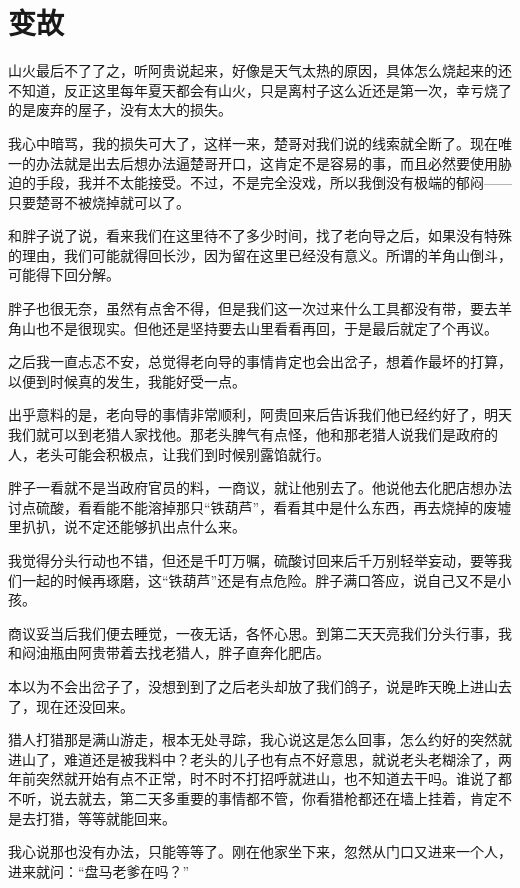 \chapter{变故}

山火最后不了了之，听阿贵说起来，好像是天气太热的原因，具体怎么烧起来的还不知道，反正这里每年夏天都会有山火，只是离村子这么近还是第一次，幸亏烧了的是废弃的屋子，没有太大的损失。

我心中暗骂，我的损失可大了，这样一来，楚哥对我们说的线索就全断了。现在唯一的办法就是出去后想办法逼楚哥开口，这肯定不是容易的事，而且必然要使用胁迫的手段，我并不太能接受。不过，不是完全没戏，所以我倒没有极端的郁闷——只要楚哥不被烧掉就可以了。

和胖子说了说，看来我们在这里待不了多少时间，找了老向导之后，如果没有特殊的理由，我们可能就得回长沙，因为留在这里已经没有意义。所谓的羊角山倒斗，可能得下回分解。

胖子也很无奈，虽然有点舍不得，但是我们这一次过来什么工具都没有带，要去羊角山也不是很现实。但他还是坚持要去山里看看再回，于是最后就定了个再议。

之后我一直忐忑不安，总觉得老向导的事情肯定也会出岔子，想着作最坏的打算，以便到时候真的发生，我能好受一点。

出乎意料的是，老向导的事情非常顺利，阿贵回来后告诉我们他已经约好了，明天我们就可以到老猎人家找他。那老头脾气有点怪，他和那老猎人说我们是政府的人，老头可能会积极点，让我们到时候别露馅就行。

胖子一看就不是当政府官员的料，一商议，就让他别去了。他说他去化肥店想办法讨点硫酸，看看能不能溶掉那只“铁葫芦”，看看其中是什么东西，再去烧掉的废墟里扒扒，说不定还能够扒出点什么来。

我觉得分头行动也不错，但还是千叮万嘱，硫酸讨回来后千万别轻举妄动，要等我们一起的时候再琢磨，这“铁葫芦”还是有点危险。胖子满口答应，说自己又不是小孩。

商议妥当后我们便去睡觉，一夜无话，各怀心思。到第二天天亮我们分头行事，我和闷油瓶由阿贵带着去找老猎人，胖子直奔化肥店。

本以为不会出岔子了，没想到到了之后老头却放了我们鸽子，说是昨天晚上进山去了，现在还没回来。

猎人打猎那是满山游走，根本无处寻踪，我心说这是怎么回事，怎么约好的突然就进山了，难道还是被我料中？老头的儿子也有点不好意思，就说老头老糊涂了，两年前突然就开始有点不正常，时不时不打招呼就进山，也不知道去干吗。谁说了都不听，说去就去，第二天多重要的事情都不管，你看猎枪都还在墙上挂着，肯定不是去打猎，等等就能回来。

我心说那也没有办法，只能等等了。刚在他家坐下来，忽然从门口又进来一个人，进来就问：“盘马老爹在吗？”


